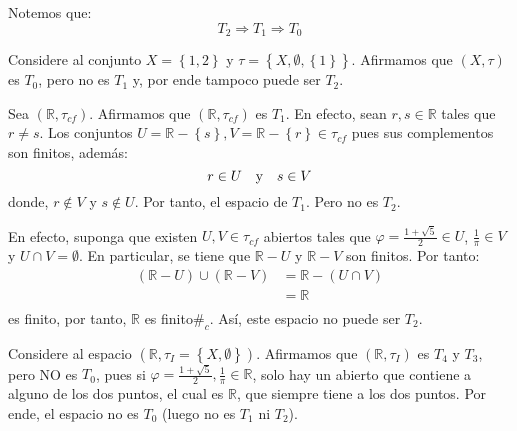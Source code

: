 \documentclass[12pt]{report}
\theoremstyle{largebreak}
\newcommand\contradiction{\ensuremath{\#_c}}
\begin{document}
    \begin{obs}
        Notemos que:
        \begin{equation*}
            T_2\Rightarrow T_1\Rightarrow T_0
        \end{equation*}
    \end{obs}

    \begin{exa}
        Considere al conjunto $X=\left\{1,2 \right\}$ y $\tau=\left\{X,\emptyset,\left\{1 \right\} \right\}$. Afirmamos que $(X,\tau)$ es $T_0$, pero no es $T_1$ y, por ende tampoco puede ser $T_2$.
    \end{exa}

    
    \begin{exa}
        Sea $(\mathbb{R},\tau_{cf})$. Afirmamos que $(\mathbb{R},\tau_{cf})$ es $T_1$. En efecto, sean $r,s\in\mathbb{R}$ tales que $r\neq s$. Los conjuntos $U=\mathbb{R}-\left\{s \right\},V=\mathbb{R}-\left\{r \right\}\in\tau_{cf}$ pues sus complementos son finitos, además:
        \begin{equation*}
            r\in U\quad\textup{y}\quad s\in V
        \end{equation*}
        donde, $r\notin V$ y $s\notin U$. Por tanto, el espacio de $T_1$. Pero no es $T_2$.

        En efecto, suponga que existen $U,V\in\tau_{cf}$ abiertos tales que $\varphi=\frac{1+\sqrt{5}}{2}\in U$, $\frac{1}{\pi}\in V$ y $U\cap V=\emptyset$. En particular, se tiene que $\mathbb{R}-U$ y $\mathbb{R}-V$ son finitos. Por tanto:
        \begin{equation*}
            \begin{split}
                (\mathbb{R}-U)\cup(\mathbb{R}-V)&=\mathbb{R}-(U\cap V)\\
                &=\mathbb{R}\\
            \end{split}
        \end{equation*}
        es finito, por tanto, $\mathbb{R}$ es finito\contradiction. Así, este espacio no puede ser $T_2$.
    \end{exa}

    \begin{exa}
        Considere al espacio $(\mathbb{R},\tau_I=\left\{X,\emptyset \right\})$. Afirmamos que $(\mathbb{R},\tau_I)$ es $T_4$ y $T_3$, pero NO es $T_0$, pues si $\varphi=\frac{1+\sqrt{5}}{2},\frac{1}{\pi}\in\mathbb{R}$, solo hay un abierto que contiene a alguno de los dos puntos, el cual es $\mathbb{R}$, que siempre tiene a los dos puntos. Por ende, el espacio no es $T_0$ (luego no es $T_1$ ni $T_2$).
    \end{exa}
\end{document}
